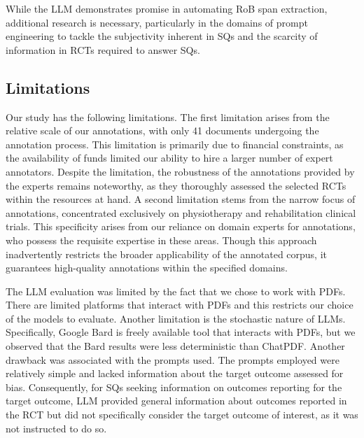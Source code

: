 \documentclass[sn-mathphys,Numbered]{sn-jnl}%
\theoremstyle{thmstyleone}%
\theoremstyle{thmstyletwo}%
\theoremstyle{thmstylethree}%
\begin{document}

While the LLM demonstrates promise in automating RoB span extraction, additional research is necessary, particularly in the domains of prompt engineering to tackle the subjectivity inherent in SQs and the scarcity of information in RCTs required to answer SQs.
%
%
%
\subsection{Limitations}
\label{subsec:limits}
%
Our study has the following limitations.
The first limitation arises from the relative scale of our annotations, with only 41 documents undergoing the annotation process.
This limitation is primarily due to financial constraints, as the availability of funds limited our ability to hire a larger number of expert annotators.
Despite the limitation, the robustness of the annotations provided by the experts remains noteworthy, as they thoroughly assessed the selected RCTs within the resources at hand.
A second limitation stems from the narrow focus of annotations, concentrated exclusively on physiotherapy and rehabilitation clinical trials.
This specificity arises from our reliance on domain experts for annotations, who possess the requisite expertise in these areas.
Though this approach inadvertently restricts the broader applicability of the annotated corpus, it guarantees high-quality annotations within the specified domains.


The LLM evaluation was limited by the fact that we chose to work with PDFs. 
There are limited platforms that interact with PDFs and this restricts our choice of the models to evaluate.
Another limitation is the stochastic nature of LLMs.
Specifically, Google Bard is freely available tool that interacts with PDFs, but we observed that the Bard results were less deterministic than ChatPDF.
Another drawback was associated with the prompts used.
The prompts employed were relatively simple and lacked information about the target outcome assessed for bias.
Consequently, for SQs seeking information on outcomes reporting for the target outcome, LLM provided general information about outcomes reported in the RCT but did not specifically consider the target outcome of interest, as it was not instructed to do so.
%
%
%
\end{document}
